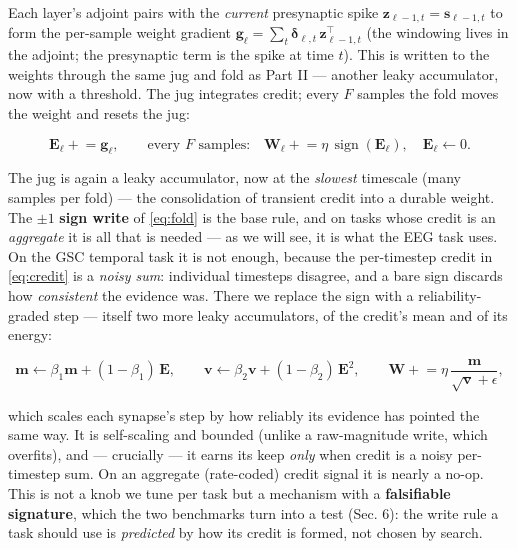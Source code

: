 \documentclass[11pt]{article}
\begin{document}
Each layer's adjoint pairs with the \emph{current} presynaptic spike
\(\bm z_{\ell-1,t}=\bm s_{\ell-1,t}\) to form the per-sample weight
gradient
\(\bm g_\ell = \sum_t \bm\delta_{\ell,t}\,\bm z_{\ell-1,t}^{\!\top}\)
(the windowing lives in the adjoint; the presynaptic term is the spike
at time \(t\)). This is written to the weights through the same jug and
fold as Part II --- another leaky accumulator, now with a threshold. The
jug integrates credit; every \(F\) samples the fold moves the weight and
resets the jug:

\begin{equation}
\bm E_\ell \mathrel{+}= \bm g_\ell, \qquad
\text{every $F$ samples:}\quad \bm W_\ell \mathrel{+}= \eta\,\operatorname{sign}(\bm E_\ell),\quad \bm E_\ell \leftarrow 0 .
\label{eq:fold}
\end{equation}

The jug is again a leaky accumulator, now at the \emph{slowest}
timescale (many samples per fold) --- the consolidation of transient
credit into a durable weight. The \(\pm1\) \textbf{sign write} of
\eqref{eq:fold} is the base rule, and on tasks whose credit is an
\emph{aggregate} it is all that is needed --- as we will see, it is what
the EEG task uses. On the GSC temporal task it is not enough, because
the per-timestep credit in \eqref{eq:credit} is a \emph{noisy sum}:
individual timesteps disagree, and a bare sign discards how
\emph{consistent} the evidence was. There we replace the sign with a
reliability-graded step --- itself two more leaky accumulators, of the
credit's mean and of its energy:

\begin{equation}
\bm m \leftarrow \beta_1 \bm m + (1-\beta_1)\,\bm E, \qquad
\bm v \leftarrow \beta_2 \bm v + (1-\beta_2)\,\bm E^{2}, \qquad
\bm W \mathrel{+}= \eta\,\frac{\bm m}{\sqrt{\bm v}+\epsilon},
\label{eq:varnorm}
\end{equation}

which scales each synapse's step by how reliably its evidence has
pointed the same way. It is self-scaling and bounded (unlike a
raw-magnitude write, which overfits), and --- crucially --- it earns its
keep \emph{only} when credit is a noisy per-timestep sum. On an
aggregate (rate-coded) credit signal it is nearly a no-op. This is not a
knob we tune per task but a mechanism with a \textbf{falsifiable
signature}, which the two benchmarks turn into a test (Sec. 6): the
write rule a task should use is \emph{predicted} by how its credit is
formed, not chosen by search.
\end{document}

